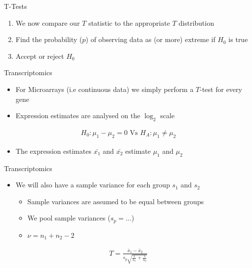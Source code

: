 \documentclass[aspectratio=169,11pt]{beamer}
\begin{document}
\begin{frame}{T-Tests}

	\begin{enumerate}
		\item We now compare our $T$ statistic to the appropriate $T$ distribution
		\item Find the probability ($p$) of observing data as (or more) extreme if $H_0$ is true
		\item Accept or reject $H_0$	
	\end{enumerate}

\end{frame}

\begin{frame}{Transcriptomics}

	\begin{itemize}
		\item For Microarrays (i.e continuous data) we simply perform a $T$-test for every gene	
		\item Expression estimates are analysed on the $\log_2$ scale
	\end{itemize}
	
	\begin{align*}
	H_0: \mu_1 - \mu_2 = 0 \text{ Vs } H_A: \mu_1 \neq \mu_2
	\end{align*}
	
	\begin{itemize}
		\item The expression estimates $\bar{x_1}$ and $\bar{x_2}$ estimate $\mu_1$ and $\mu_2$
	\end{itemize}
	
\end{frame}

\begin{frame}{Transcriptomics}	
	
	\begin{itemize}
		\item We will also have a sample variance for each group $s_1$ and $s_2$
		\begin{itemize}
			\item Sample variances are assumed to be equal between groups
			\item We pool sample variances ($s_p = \ldots$)
			\item $\nu = n_1 + n_2 - 2$
		\end{itemize}
	\end{itemize}
	
	\begin{align*}
		T = \frac{\bar{x}_1 - \bar{x}_2}{s_p \sqrt{\frac{1}{n_1} + \frac{1}{n_2}}}
	\end{align*}
	
\end{frame}
\end{document}
